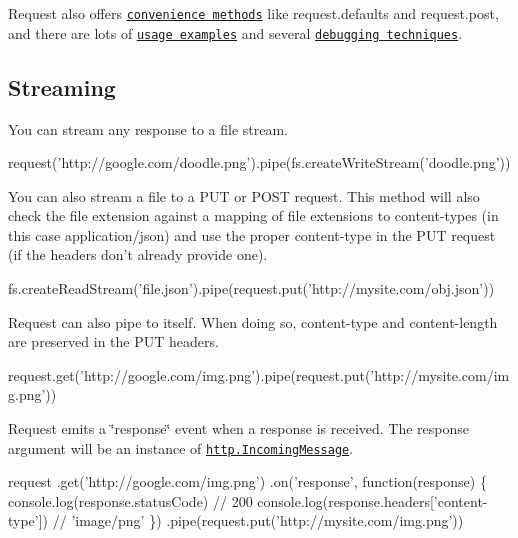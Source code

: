 Request also offers \href{#convenience-methods}{\tt convenience methods} like {\ttfamily request.\+defaults} and {\ttfamily request.\+post}, and there are lots of \href{#examples}{\tt usage examples} and several \href{#debugging}{\tt debugging techniques}.





\subsection*{Streaming}

You can stream any response to a file stream.


\begin{DoxyCode}
request('http://google.com/doodle.png').pipe(fs.createWriteStream('doodle.png'))
\end{DoxyCode}


You can also stream a file to a P\+UT or P\+O\+ST request. This method will also check the file extension against a mapping of file extensions to content-\/types (in this case {\ttfamily application/json}) and use the proper {\ttfamily content-\/type} in the P\+UT request (if the headers don’t already provide one).


\begin{DoxyCode}
fs.createReadStream('file.json').pipe(request.put('http://mysite.com/obj.json'))
\end{DoxyCode}


Request can also {\ttfamily pipe} to itself. When doing so, {\ttfamily content-\/type} and {\ttfamily content-\/length} are preserved in the P\+UT headers.


\begin{DoxyCode}
request.get('http://google.com/img.png').pipe(request.put('http://mysite.com/img.png'))
\end{DoxyCode}


Request emits a \char`\"{}response\char`\"{} event when a response is received. The {\ttfamily response} argument will be an instance of \href{https://nodejs.org/api/http.html#http_class_http_incomingmessage}{\tt http.\+Incoming\+Message}.


\begin{DoxyCode}
request
  .get('http://google.com/img.png')
  .on('response', function(response) \{
    console.log(response.statusCode) // 200
    console.log(response.headers['content-type']) // 'image/png'
  \})
  .pipe(request.put('http://mysite.com/img.png'))
\end{DoxyCode}


